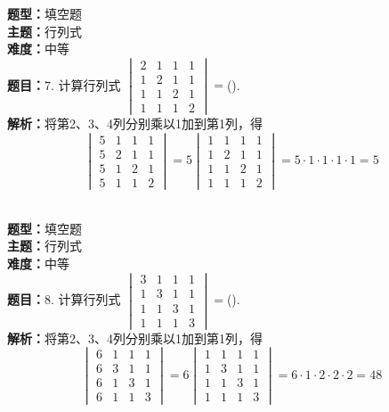 \documentclass{ctexart}
\newenvironment{question}[5]{%
	\noindent\textbf{题型：}#1\\
	\textbf{主题：}#2\\
	\textbf{难度：}#3\\
	\textbf{题目：}#4\\
	\textbf{解析：}#5\\
	\vspace{1em}
}{}
\begin{document}
	\begin{question}
		{填空题}
		{行列式}
		{中等}
		{7. 计算行列式 \(\begin{vmatrix}2 & 1 & 1 & 1 \\ 1 & 2 & 1 & 1 \\ 1 & 1 & 2 & 1 \\ 1 & 1 & 1 & 2\end{vmatrix}=\)(\qquad). }
		{将第2、3、4列分别乘以1加到第1列，得
			\[
			\begin{vmatrix}
				5 & 1 & 1 & 1 \\
				5 & 2 & 1 & 1 \\
				5 & 1 & 2 & 1 \\
				5 & 1 & 1 & 2
			\end{vmatrix}=5\begin{vmatrix}
				1 & 1 & 1 & 1 \\
				1 & 2 & 1 & 1 \\
				1 & 1 & 2 & 1 \\
				1 & 1 & 1 & 2
			\end{vmatrix}=5\cdot1\cdot1\cdot1\cdot1=5
			\]}
	\end{question}
	
	\begin{question}
		{填空题}
		{行列式}
		{中等}
		{8. 计算行列式 \(\begin{vmatrix}3 & 1 & 1 & 1 \\ 1 & 3 & 1 & 1 \\ 1 & 1 & 3 & 1 \\ 1 & 1 & 1 & 3\end{vmatrix}=\)(\qquad). }
		{将第2、3、4列分别乘以1加到第1列，得
			\[
			\begin{vmatrix}
				6 & 1 & 1 & 1 \\
				6 & 3 & 1 & 1 \\
				6 & 1 & 3 & 1 \\
				6 & 1 & 1 & 3
			\end{vmatrix}=6\begin{vmatrix}
				1 & 1 & 1 & 1 \\
				1 & 3 & 1 & 1 \\
				1 & 1 & 3 & 1 \\
				1 & 1 & 1 & 3
			\end{vmatrix}=6\cdot1\cdot2\cdot2\cdot2=48
			\]}
	\end{question}
	
\end{document}
